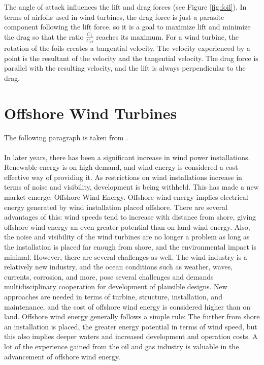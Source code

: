 \noindent The angle of attack influences the lift and drag forces (see Figure \ref{fig:foil}). In terms of airfoils used in wind turbines, the drag force is just a parasite component following the lift force, so it is a goal to maximize lift and minimize the drag so that the ratio $\frac{C_L}{C_D}$ reaches its maximum. For a wind turbine, the rotation of the foils creates a tangential velocity. The velocity experienced by a point is the resultant of the velocity and the tangential velocity. The drag force is parallel with the resulting velocity, and the lift is always perpendicular to the drag. 

\section{Offshore Wind Turbines}
The following paragraph is taken from \cite{Kapsali2012}.\\\\ In later years, there has been a significant increase in wind power installations. Renewable energy is on high demand, and wind energy is considered a cost-effective way of providing it. As restrictions on wind installations increase in terms of noise and visibility, development is being withheld. This has made a new market emerge: Offshore Wind Energy. Offshore wind energy implies electrical energy generated by wind installation placed offshore.  There are several advantages of this: wind speeds tend to increase with distance from shore, giving offshore wind energy an even greater potential than on-land wind energy. Also, the noise and visibility of the wind turbines are no longer a problem as long as the installation is placed far enough from shore, and the environmental impact is minimal. However, there are several challenges as well. The wind industry is a relatively new industry, and the ocean conditions such as weather, waves, currents, corrosion, and more, pose several challenges and demands multidisciplinary cooperation for development of plausible designs. New approaches are needed in terms of turbine, structure, installation, and maintenance, and the cost of offshore wind energy is considered higher than on land. Offshore wind energy generally follows a simple rule: The further from shore an installation is placed, the greater energy potential in terms of wind speed, but this also implies deeper waters and increased development and operation costs. A lot of the experience gained from the oil and gas industry is valuable in the advancement of offshore wind energy. 

